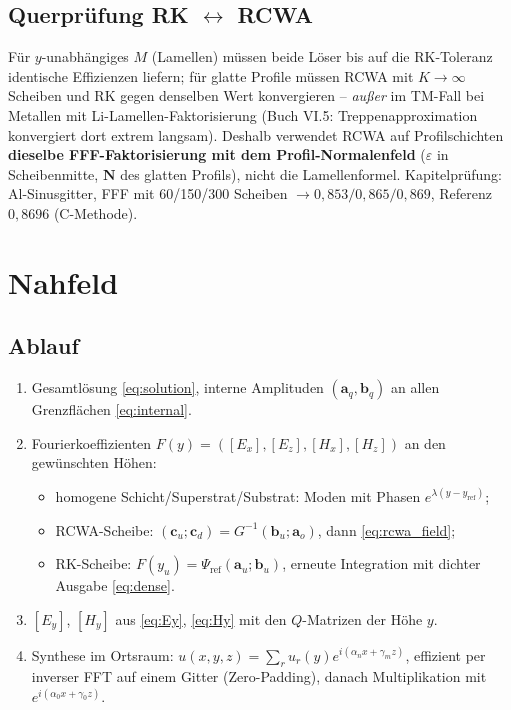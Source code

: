 \subsection{Querprüfung RK $\leftrightarrow$ RCWA}
Für $y$-unabhängiges $M$ (Lamellen) müssen beide Löser bis auf die RK-Toleranz identische Effizienzen
liefern; für glatte Profile müssen RCWA mit $K\to\infty$ Scheiben und RK gegen denselben Wert
konvergieren -- \emph{außer} im TM-Fall bei Metallen mit Li-Lamellen-Faktorisierung (Buch VI.5:
Treppenapproximation konvergiert dort extrem langsam). Deshalb verwendet RCWA auf Profilschichten
\textbf{dieselbe FFF-Faktorisierung mit dem Profil-Normalenfeld} ($\varepsilon$ in Scheibenmitte, $\mathbf N$ des
glatten Profils), nicht die Lamellenformel. Kapitelprüfung: Al-Sinusgitter, FFF mit 60/150/300 Scheiben
$\to0{,}853/0{,}865/0{,}869$, Referenz $0{,}8696$ (C-Methode).

\section{Nahfeld}\label{sec:field}

\subsection{Ablauf}
\begin{enumerate}[nosep]
  \item Gesamtlösung \eqref{eq:solution}, interne Amplituden $(\mathbf a_q,\mathbf b_q)$ an allen Grenzflächen \eqref{eq:internal}.
  \item Fourierkoeffizienten $F(y)=([E_x],[E_z],[H_x],[H_z])$ an den gewünschten Höhen:
    \begin{itemize}[nosep]
      \item homogene Schicht/Superstrat/Substrat: Moden mit Phasen $e^{\lambda(y-y_{\text{ref}})}$;
      \item RCWA-Scheibe: $(\mathbf c_u;\mathbf c_d)=G^{-1}(\mathbf b_u;\mathbf a_o)$, dann \eqref{eq:rcwa_field};
      \item RK-Scheibe: $F(y_u)=\Psi_{\text{ref}}(\mathbf a_u;\mathbf b_u)$, erneute Integration mit dichter Ausgabe \eqref{eq:dense}.
    \end{itemize}
  \item $[E_y]$, $[H_y]$ aus \eqref{eq:Ey}, \eqref{eq:Hy} mit den $Q$-Matrizen der Höhe $y$.
  \item Synthese im Ortsraum: $u(x,y,z)=\sum_ru_r(y)e^{i(\alpha_nx+\gamma_mz)}$, effizient per inverser FFT
        auf einem Gitter (Zero-Padding), danach Multiplikation mit $e^{i(\alpha_0x+\gamma_0z)}$.
\end{enumerate}

